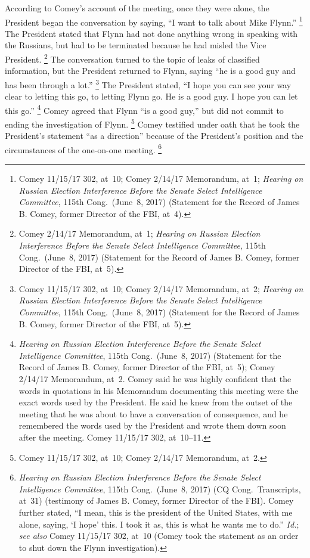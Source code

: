 According to Comey's account of the meeting, once they were alone, the President began the conversation by saying, ``I want to talk about Mike Flynn.''%
\footnote{Comey 11/15/17 302, at~10;
Comey 2/14/17 Memorandum, at~1;
\textit{Hearing on Russian Election Interference Before the Senate Select Intelligence Committee}, 115th Cong.\ (June~8, 2017) (Statement for the Record of James B. Comey, former Director of the FBI, at~4).}
The President stated that Flynn had not done anything wrong in speaking with the Russians, but had to be terminated because he had misled the Vice President.%
\footnote{Comey 2/14/17 Memorandum, at~1;
\textit{Hearing on Russian Election Interference Before the Senate Select Intelligence Committee}, 115th Cong.\ (June~8, 2017) (Statement for the Record of James B. Comey, former Director of the FBI, at~5).}
The conversation turned to the topic of leaks of classified information, but the President returned to Flynn, saying ``he is a good guy and has been through a lot.''%
\footnote{Comey 11/15/17 302, at~10;
Comey 2/14/17 Memorandum, at~2;
\textit{Hearing on Russian Election Interference Before the Senate Select Intelligence Committee}, 115th Cong.\ (June~8, 2017) (Statement for the Record of James B. Comey, former Director of the FBI, at~5).}
The President stated, ``I hope you can see your way clear to letting this go, to letting Flynn go.
He is a good guy.
I hope you can let this go.''%
\footnote{\textit{Hearing on Russian Election Interference Before the Senate Select Intelligence Committee}, 115th Cong.\ (June~8, 2017) (Statement for the Record of James B. Comey, former Director of the FBI, at~5);
Comey 2/14/17 Memorandum, at~2.
Comey said he was highly confident that the words in quotations in his Memorandum documenting this meeting were the exact words used by the President.
He said he knew from the outset of the meeting that he was about to have a conversation of consequence, and he remembered the words used by the President and wrote them down soon after the meeting.
Comey 11/15/17 302, at~10--11.}
Comey agreed that Flynn ``is a good guy,'' but did not commit to ending the investigation of Flynn.%
\footnote{Comey 11/15/17 302, at~10;
Comey 2/14/17 Memorandum, at~2.}
Comey testified under oath that he took the President's statement ``as a direction'' because of the President's position and the circumstances of the one-on-one meeting.%
\footnote{\textit{Hearing on Russian Election Interference Before the Senate Select Intelligence Committee}, 115th Cong.\ (June~8, 2017) (CQ Cong.\ Transcripts, at~31) (testimony of James B. Comey, former Director of the FBI).
Comey further stated, ``I mean, this is the president of the United States, with me alone, saying, `I hope' this.
I took it as, this is what he wants me to do.'' \textit{Id.};
\textit{see also} Comey 11/15/17 302, at~10 (Comey took the statement as an order to shut down the Flynn investigation).}

